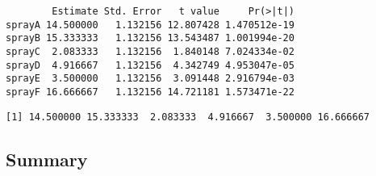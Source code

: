 \documentclass[12pt,]{04-class-files/abntex2}
\newenvironment{Shaded}{\begin{snugshade}}{\end{snugshade}}
\newcommand{\DataTypeTok}[1]{\textcolor[rgb]{0.13,0.29,0.53}{#1}}
\newcommand{\DecValTok}[1]{\textcolor[rgb]{0.00,0.00,0.81}{#1}}
\newcommand{\KeywordTok}[1]{\textcolor[rgb]{0.13,0.29,0.53}{\textbf{#1}}}
\newcommand{\NormalTok}[1]{#1}
\newcommand{\OperatorTok}[1]{\textcolor[rgb]{0.81,0.36,0.00}{\textbf{#1}}}
\newcommand{\StringTok}[1]{\textcolor[rgb]{0.31,0.60,0.02}{#1}}
\begin{document}
\begin{Shaded}
\end{Shaded}

\begin{verbatim}
        Estimate Std. Error   t value     Pr(>|t|)
sprayA 14.500000   1.132156 12.807428 1.470512e-19
sprayB 15.333333   1.132156 13.543487 1.001994e-20
sprayC  2.083333   1.132156  1.840148 7.024334e-02
sprayD  4.916667   1.132156  4.342749 4.953047e-05
sprayE  3.500000   1.132156  3.091448 2.916794e-03
sprayF 16.666667   1.132156 14.721181 1.573471e-22
\end{verbatim}

\begin{Shaded}
\end{Shaded}

\begin{verbatim}
[1] 14.500000 15.333333  2.083333  4.916667  3.500000 16.666667
\end{verbatim}

\hypertarget{summary}{%
\subsection{Summary}\label{summary}}
\end{document}
